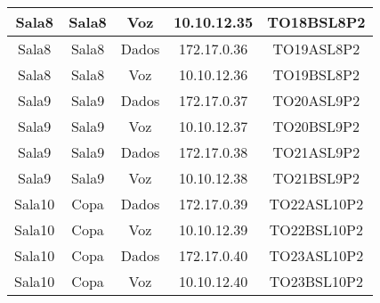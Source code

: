 \begin{table}[]
\begin{tabular}{ccccc}
		Sala8  & Sala8              & Voz             & 10.10.12.35     & TO18BSL8P2           \\ \hline
		Sala8  & Sala8              & Dados        	  & 172.17.0.36 	& TO19ASL8P2           \\ \hline
		Sala8  & Sala8              & Voz             & 10.10.12.36     & TO19BSL8P2           \\ \hline
		Sala9  & Sala9              & Dados       	  & 172.17.0.37 	& TO20ASL9P2           \\ \hline
		Sala9  & Sala9              & Voz             & 10.10.12.37     & TO20BSL9P2           \\ \hline
		Sala9  & Sala9              & Dados           & 172.17.0.38  	& TO21ASL9P2           \\ \hline
		Sala9  & Sala9              & Voz             & 10.10.12.38     & TO21BSL9P2           \\ \hline
		Sala10 & Copa               & Dados           & 172.17.0.39 	& TO22ASL10P2          \\ \hline
		Sala10 & Copa               & Voz             & 10.10.12.39     & TO22BSL10P2          \\ \hline
		Sala10 & Copa               & Dados           & 172.17.0.40 	& TO23ASL10P2          \\ \hline
		Sala10 & Copa               & Voz             & 10.10.12.40     & TO23BSL10P2          \\ \hline
	\end{tabular}
\end{table}